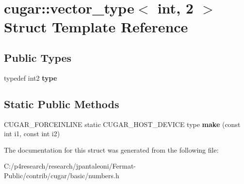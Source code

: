 \hypertarget{structcugar_1_1vector__type_3_01int_00_012_01_4}{}\section{cugar\+:\+:vector\+\_\+type$<$ int, 2 $>$ Struct Template Reference}
\label{structcugar_1_1vector__type_3_01int_00_012_01_4}
\subsection*{Public Types}
\begin{DoxyCompactItemize}
\item 
\mbox{\label{structcugar_1_1vector__type_3_01int_00_012_01_4_a4cbbc5576095c644412147d41b6eaa28}} 
typedef int2 {\bfseries type}
\end{DoxyCompactItemize}
\subsection*{Static Public Methods}
\begin{DoxyCompactItemize}
\item 
\mbox{\label{structcugar_1_1vector__type_3_01int_00_012_01_4_ad74e2e3e86d523e8edd84bf04702de7f}} 
C\+U\+G\+A\+R\+\_\+\+F\+O\+R\+C\+E\+I\+N\+L\+I\+NE static C\+U\+G\+A\+R\+\_\+\+H\+O\+S\+T\+\_\+\+D\+E\+V\+I\+CE type {\bfseries make} (const int i1, const int i2)
\end{DoxyCompactItemize}


The documentation for this struct was generated from the following file\+:\begin{DoxyCompactItemize}
\item 
C\+:/p4research/research/jpantaleoni/\+Fermat-\/\+Public/contrib/cugar/basic/numbers.\+h\end{DoxyCompactItemize}
